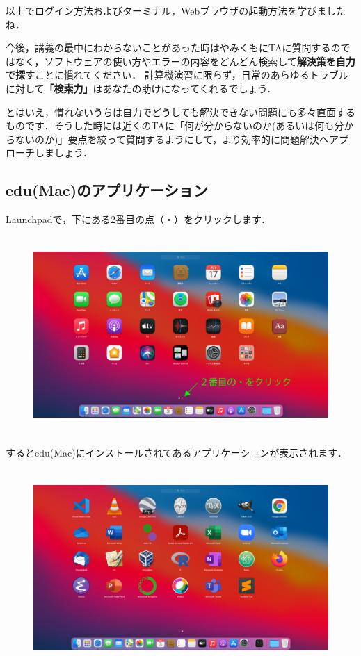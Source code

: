 \documentclass{jarticle}
\begin{document}
以上でログイン方法およびターミナル，Webブラウザの起動方法を学びましたね．

今後，講義の最中にわからないことがあった時はやみくもにTAに質問するのではなく，ソフトウェアの使い方やエラーの内容をどんどん検索して{\bf 解決策を自力で探す}ことに慣れてください．
計算機演習に限らず，日常のあらゆるトラブルに対して{\bf 「検索力」}はあなたの助けになってくれるでしょう．

とはいえ，慣れないうちは自力でどうしても解決できない問題にも多々直面するものです．そうした時には近くのTAに「何が分からないのか(あるいは何も分からないのか)」要点を絞って質問するようにして，より効率的に問題解決へアプローチしましょう．

\subsection{edu(Mac)のアプリケーション}
Launchpadで，下にある2番目の点（・）をクリックします．
\begin{figure}[H]
  \centering
  \includegraphics[height=7.5cm]{fig/MacLaunchpadClick2.png}
\end{figure}

\newpage
するとedu(Mac)にインストールされてあるアプリケーションが表示されます．
\begin{figure}[H]
  \centering
  \includegraphics[height=7.5cm]{fig/MacLaunchpad2.png}
\end{figure}
\end{document}
